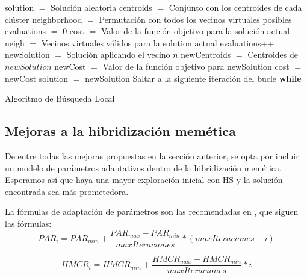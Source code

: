 \vspace{\baselineskip}

\begin{algorithm}[H]
    \SetAlgoLined
        solution $=$ Solución aleatoria \;
        centroids $=$ Conjunto con los centroides de cada clúster \;
        neighborhood $=$ Permutación con todos los vecinos virtuales posibles \;
        evaluations $=$ 0 \;
        cost $=$ Valor de la función objetivo para la solución actual \;
         {
            neigh $=$ Vecinos virtuales válidos para la solution actual \;
             {
                evaluations++ \;
                newSolution $=$ Solución aplicando el vecino $n$ \;
                newCentroids $=$ Centroides de $newSolution$ \;
                newCost $=$ Valor de la función objetivo para newSolution \;
                 {
                    cost $=$ newCost \;
                    solution $=$ newSolution \;
                    Saltar a la siguiente iteración del bucle \textbf{while} \;
                }
            }
        }
    \caption{Algoritmo de Búsqueda Local}
\end{algorithm}

\newpage

\subsection{Mejoras a la hibridización memética}

De entre todas las mejoras propuestas en la sección anterior, se opta por incluir un modelo de parámetros adaptativos dentro de la hibridización memética. Esperamos así que haya una mayor exploración inicial con HS y la solución encontrada sea más prometedora.

\vspace{\baselineskip}

La fórmulas de adaptación de parámetros son las recomendadas en \cite{hs4}, que siguen las fórmulas:
\begin{equation}
    PAR_i = PAR_{min} + \frac{PAR_{max} - PAR_{min}}{maxIteraciones} * (maxIteraciones - i)
\end{equation}

\vspace{\baselineskip}

\begin{equation}
    HMCR_i = HMCR_{min} + \frac{HMCR_{max} - HMCR_{min}}{maxIteraciones} * i
\end{equation}

